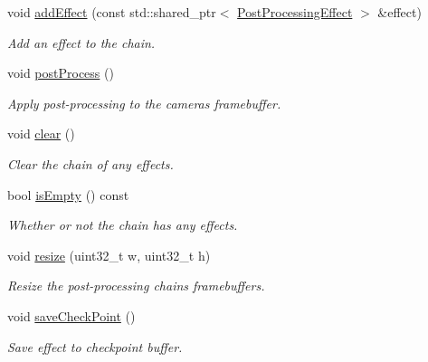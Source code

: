\begin{Indent}
\begin{DoxyCompactItemize}
void \mbox{\hyperlink{classrev_1_1_post_processing_chain_acba34d31316bc5b83aaa1111bdfe3688}{add\+Effect}} (const std\+::shared\+\_\+ptr$<$ \mbox{\hyperlink{classrev_1_1_post_processing_effect}{Post\+Processing\+Effect}} $>$ \&effect)
\begin{DoxyCompactList}\small\item\em Add an effect to the chain. \end{DoxyCompactList}\item 
\mbox{\label{classrev_1_1_post_processing_chain_a7d39ae2db5e35c1961e8eb716693c755}} 
void \mbox{\hyperlink{classrev_1_1_post_processing_chain_a7d39ae2db5e35c1961e8eb716693c755}{post\+Process}} ()
\begin{DoxyCompactList}\small\item\em Apply post-\/processing to the camera\textquotesingle{}s framebuffer. \end{DoxyCompactList}\item 
\mbox{\label{classrev_1_1_post_processing_chain_acf692260e303baf767b6bcf884679284}} 
void \mbox{\hyperlink{classrev_1_1_post_processing_chain_acf692260e303baf767b6bcf884679284}{clear}} ()
\begin{DoxyCompactList}\small\item\em Clear the chain of any effects. \end{DoxyCompactList}\item 
\mbox{\label{classrev_1_1_post_processing_chain_a784e68e6272959c021df55deb464ac67}} 
bool \mbox{\hyperlink{classrev_1_1_post_processing_chain_a784e68e6272959c021df55deb464ac67}{is\+Empty}} () const
\begin{DoxyCompactList}\small\item\em Whether or not the chain has any effects. \end{DoxyCompactList}\item 
\mbox{\label{classrev_1_1_post_processing_chain_af2df7a09deb57bf3aea041fee4e0371b}} 
void \mbox{\hyperlink{classrev_1_1_post_processing_chain_af2df7a09deb57bf3aea041fee4e0371b}{resize}} (uint32\+\_\+t w, uint32\+\_\+t h)
\begin{DoxyCompactList}\small\item\em Resize the post-\/processing chain\textquotesingle{}s framebuffers. \end{DoxyCompactList}\item 
\mbox{\label{classrev_1_1_post_processing_chain_a8544ec982d21040a61465d367252674f}} 
void \mbox{\hyperlink{classrev_1_1_post_processing_chain_a8544ec982d21040a61465d367252674f}{save\+Check\+Point}} ()
\begin{DoxyCompactList}\small\item\em Save effect to checkpoint buffer. \end{DoxyCompactList}\end{DoxyCompactItemize}
\end{Indent}
